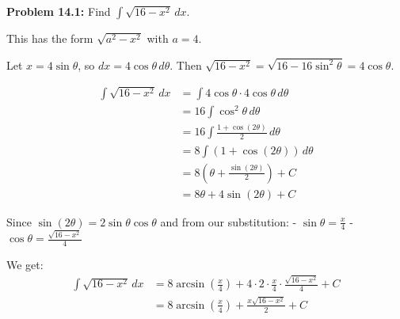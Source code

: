 \documentclass[12pt,a4paper]{book}
\theoremstyle{definition}
\begin{document}
\begin{solution}
\textbf{Problem 14.1:} Find $\int \sqrt{16 - x^2} \, dx$.

This has the form $\sqrt{a^2 - x^2}$ with $a = 4$.

Let $x = 4\sin\theta$, so $dx = 4\cos\theta \, d\theta$.
Then $\sqrt{16 - x^2} = \sqrt{16 - 16\sin^2\theta} = 4\cos\theta$.

\begin{align}
\int \sqrt{16 - x^2} \, dx &= \int 4\cos\theta \cdot 4\cos\theta \, d\theta\\
&= 16\int \cos^2\theta \, d\theta\\
&= 16\int \frac{1 + \cos(2\theta)}{2} \, d\theta\\
&= 8\int (1 + \cos(2\theta)) \, d\theta\\
&= 8\left(\theta + \frac{\sin(2\theta)}{2}\right) + C\\
&= 8\theta + 4\sin(2\theta) + C
\end{align}

Since $\sin(2\theta) = 2\sin\theta\cos\theta$ and from our substitution:
- $\sin\theta = \frac{x}{4}$
- $\cos\theta = \frac{\sqrt{16-x^2}}{4}$

We get:
\begin{align}
\int \sqrt{16 - x^2} \, dx &= 8\arcsin\left(\frac{x}{4}\right) + 4 \cdot 2 \cdot \frac{x}{4} \cdot \frac{\sqrt{16-x^2}}{4} + C\\
&= 8\arcsin\left(\frac{x}{4}\right) + \frac{x\sqrt{16-x^2}}{2} + C
\end{align}
\end{solution}
\end{document}

